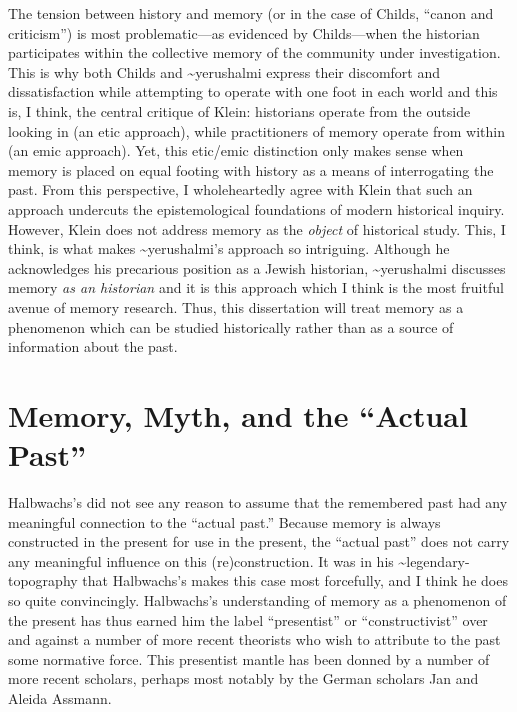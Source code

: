 The tension between history and memory (or in the case of Childs,
``canon and criticism'') is most problematic---as evidenced by
Childs---when the historian participates within the collective memory of
the community under investigation. This is why both Childs and
\textasciitilde{}yerushalmi express their discomfort and dissatisfaction
while attempting to operate with one foot in each world and this is, I
think, the central critique of Klein: historians operate from the
outside looking in (an etic approach), while practitioners of memory
operate from within (an emic approach). Yet, this etic/emic distinction
only makes sense when memory is placed on equal footing with history as
a means of interrogating the past. From this perspective, I
wholeheartedly agree with Klein that such an approach undercuts the
epistemological foundations of modern historical inquiry. However, Klein
does not address memory as the \emph{object} of historical study. This,
I think, is what makes \textasciitilde{}yerushalmi's approach so
intriguing. Although he acknowledges his precarious position as a Jewish
historian, \textasciitilde{}yerushalmi discusses memory \emph{as an
historian} and it is this approach which I think is the most fruitful
avenue of memory research. Thus, this dissertation will treat memory as
a phenomenon which can be studied historically rather than as a source
of information about the past.

\hypertarget{memory-myth-and-the-actual-past}{%
\section{Memory, Myth, and the ``Actual
Past''}\label{memory-myth-and-the-actual-past}}

Halbwachs's did not see any reason to assume that the remembered past
had any meaningful connection to the ``actual past.'' Because memory is
always constructed in the present for use in the present, the ``actual
past'' does not carry any meaningful influence on this (re)construction.
It was in his \textasciitilde{}legendary-topography that Halbwachs's
makes this case most forcefully, and I think he does so quite
convincingly. Halbwachs's understanding of memory as a phenomenon of the
present has thus earned him the label ``presentist'' or
``constructivist'' over and against a number of more recent theorists
who wish to attribute to the past some normative
force.\autocite[27--30]{coser_halbwachs1992} This presentist mantle has
been donned by a number of more recent scholars, perhaps most notably by
the German scholars Jan and Aleida Assmann.\autocites[See
esp.][]{assmann_nikulin2015}{assmann2011}[and][]{a_assmann2011}

